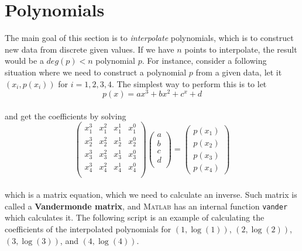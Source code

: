\documentclass[paper=a4, fontsize=11pt]{scrartcl}
\newcommand{\MATLAB}{\textsc{Matlab}\xspace}
\begin{document}
\vspace{0.15in}

\section{Polynomials}
\vspace{0.25in}

The main goal of this section is to \textit{interpolate} polynomials, which is to construct new data from discrete given values. If we have $n$ points to interpolate, the result would be a $deg(p) < n$ polynomial $p$. For instance, consider a following situation where we need to construct a polynomial $p$ from a given data, let it $(x_i,p(x_i))$ for $i=1,2,3,4$. The simplest way to perform this is to let \\

\begin{equation}\nonumber
	p(x) = ax^3 + bx^2 + c^x + d 
\end{equation}\\

and get the coefficients by solving \\

\begin{equation}\nonumber
	\begin{pmatrix}
	x_1^3 & x_1^2 & x_1^1 & x_1^0 \\
	x_2^3 & x_2^2 & x_2^1 & x_2^0 \\
	x_3^3 & x_3^2 & x_3^1 & x_3^0 \\
	x_4^3 & x_4^2 & x_4^1 & x_4^0 \\
	\end{pmatrix}
	\begin{pmatrix}
	a \\ b\\ c \\ d\\
	\end{pmatrix}
	=
	\begin{pmatrix}
	p(x_1) \\ p(x_2) \\ p(x_3) \\ p(x_4)
	\end{pmatrix}
\end{equation}\\

which is a matrix equation, which we need to calculate an inverse. Such matrix is called a \textbf{Vandermonde matrix}, and \MATLAB has an internal function \texttt{vander} which calculates it. The following script is an example of calculating the coefficients of the interpolated polynomials for $(1,\log(1))$, $(2,\log(2))$, $(3,\log(3))$, and $(4,\log(4))$.
\end{document}
